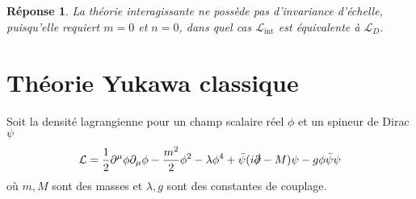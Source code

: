 \documentclass{article}
\numberwithin{equation}{section}
\theoremstyle{solution}
\newtheorem{solution}{Réponse}[section]
\begin{document}
\subsection{}
\begin{solution}
        La théorie interagissante ne possède pas d'invariance d'échelle, puisqu'elle requiert $m=0$ et $n = 0$, dans quel cas $\mathcal{L}_{\mathrm{int}}$ est 
        équivalente à $\mathcal{L}_D$.
\end{solution}

\section{Théorie Yukawa classique}
Soit la densité lagrangienne pour un champ scalaire réel $\phi$ et un spineur de Dirac $\psi$
\begin{equation}
        \mathcal{L} = \frac{1}{2}\partial^{\mu}\phi \partial_\mu \phi - \frac{m^{2}}{2}\phi^{2} - \lambda \phi^{4} + \bar{\psi}(i \slashed{\partial} - M) \psi - g \phi\bar{\psi}\psi
\end{equation} 
où $m, M$ sont des masses et $\lambda,g$ sont des constantes de couplage.
\end{document}
